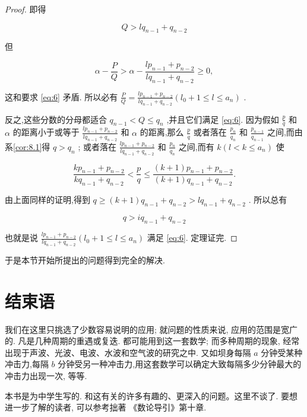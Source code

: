 \documentclass{ctexart}
\begin{document}
\begin{proof}
即得

\[
Q > l{q}_{n - 1} + {q}_{n - 2}
\]

但

\[
\alpha - \frac{P}{Q} > \alpha - \frac{l{p}_{n - 1} + {p}_{n - 2}}{l{q}_{n - 1} + {q}_{n - 2}} \geq 0,
\]

这和要求 \eqref{eq:6} 矛盾. 所以必有 \(\frac{P}{Q} = \frac{l{p}_{n - 1} + {p}_{n - 2}}{l{q}_{n - 1} + {q}_{n - 2}}\left( {{l}_{0} + 1 \leq l \leq {a}_{n}}\right)\) .

反之,这些分数的分母都适合 \({q}_{n - 1} < Q \leq {q}_{n}\) ,并且它们满足  \eqref{eq:6}. 因为假如 \(\frac{p}{q}\) 和 \(\alpha\) 的距离小于或等于 \(\frac{l{p}_{n - 1} + {p}_{n - 2}}{l{q}_{n - 1} + {q}_{n - 2}}\) 和 \(\alpha\) 的距离,那么 \(\frac{p}{q}\) 或者落在 \(\frac{{p}_{n}}{{q}_{n}}\) 和 \(\frac{{p}_{n - 1}}{{q}_{n - 1}}\) 之间,而由系\ref{cor:8.1}得 \(q > {q}_{n}\) ; 或者落在 \(\frac{l{p}_{n - 1} + {p}_{n - 2}}{l{q}_{n - 1} + {q}_{n - 2}}\) 和 \(\frac{{p}_{n}}{{q}_{n}}\) 之间,而有 \(k\left( {l < k \leq {a}_{n}}\right)\) 使

\[
\frac{k{p}_{n - 1} + {p}_{n - 2}}{k{q}_{n - 1} + {q}_{n - 2}} < \frac{p}{q} \leq \frac{\left( {k + 1}\right) {p}_{n - 1} + {p}_{n - 2}}{\left( {k + 1}\right) {q}_{n - 1} + {q}_{n - 2}}.
\]

由上面同样的证明,得到 \(q \geq \left( {k + 1}\right) {q}_{n - 1} + {q}_{n - 2} > l{q}_{n - 1} + {q}_{n - 2}\) . 所以总有

\[
q > i{q}_{n - 1} + {q}_{n - 2}
\]

也就是说 \(\frac{l{p}_{n - 1} + {p}_{n - 2}}{l{q}_{n - 1} + {q}_{n - 2}}\left( {{l}_{0} + 1 \leq l \leq {a}_{n}}\right)\) 满足 \eqref{eq:6}. 定理证完. 
\end{proof}

于是本节开始所提出的问题得到完全的解决.

\section{结束语}

我们在这里只挑选了少数容易说明的应用; 就问题的性质来说, 应用的范围是宽广的. 凡是几种周期的重遇或复迭. 都可能用到这一套数学; 而多种周期的现象, 经常出现于声波、光波、电波、水波和空气波的研究之中. 又如坝身每隔 \(a\) 分钟受某种冲击力,每隔 \(b\) 分钟受另一种冲击力,用这套数学可以确定大致每隔多少分钟最大的冲击力出现一次, 等等.

本书是为中学生写的. 和这有关的许多有趣的、更深入的问题。这里不谈了. 要想进一步了解的读者, 可以参考拙著 《数论导引》第十章.
\end{document}
